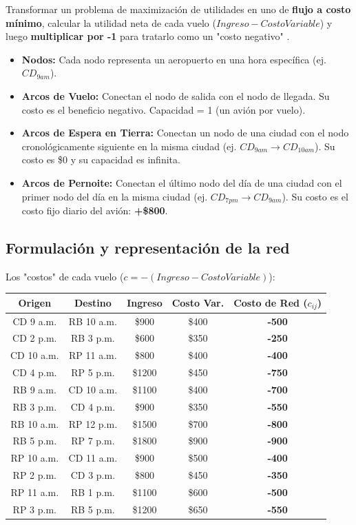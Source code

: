 \documentclass[10pt,a4paper]{article}
\begin{document}
Transformar un problema de maximización de utilidades en uno de \textbf{flujo a costo mínimo},
calcular la utilidad neta de cada vuelo 
($Ingreso - Costo Variable$) y luego 
\textbf{multiplicar por -1} 
para tratarlo como un "costo negativo" .

\begin{itemize}
    \item \textbf{Nodos:} Cada nodo representa un aeropuerto en una hora específica (ej. $CD_{9am}$).
    \item \textbf{Arcos de Vuelo:} Conectan el nodo de salida con el nodo de llegada. Su costo es el beneficio negativo. Capacidad = 1 (un avión por vuelo).
    \item \textbf{Arcos de Espera en Tierra:} Conectan un nodo de una ciudad con el nodo cronológicamente siguiente en la misma ciudad (ej. $CD_{9am} \to CD_{10am}$). Su costo es \$0 y su capacidad es infinita.
    \item \textbf{Arcos de Pernoite:} Conectan el último nodo del día de una ciudad con el primer nodo del día en la misma ciudad (ej. $CD_{7pm} \to CD_{9am}$). Su costo es el costo fijo diario del avión: \textbf{+\$800}.
\end{itemize}

\subsection{Formulación y representación de la red}

Los "costos" de cada vuelo ($c = -(Ingreso - Costo Variable)$):

\begin{table}[h!]
\centering
\begin{tabular}{ccccc}
\hline
\textbf{Origen} & \textbf{Destino} & \textbf{Ingreso} & \textbf{Costo Var.} & \textbf{Costo de Red ($c_{ij}$)} \\
\hline
CD 9 a.m. & RB 10 a.m. & \$900 & \$400 & \textbf{-500} \\
CD 2 p.m. & RB 3 p.m. & \$600 & \$350 & \textbf{-250} \\
CD 10 a.m. & RP 11 a.m. & \$800 & \$400 & \textbf{-400} \\
CD 4 p.m. & RP 5 p.m. & \$1200 & \$450 & \textbf{-750} \\
RB 9 a.m. & CD 10 a.m. & \$1100 & \$400 & \textbf{-700} \\
RB 3 p.m. & CD 4 p.m. & \$900 & \$350 & \textbf{-550} \\
RB 10 a.m. & RP 12 p.m. & \$1500 & \$700 & \textbf{-800} \\
RB 5 p.m. & RP 7 p.m. & \$1800 & \$900 & \textbf{-900} \\
RP 10 a.m. & CD 11 a.m. & \$900 & \$500 & \textbf{-400} \\
RP 2 p.m. & CD 3 p.m. & \$800 & \$450 & \textbf{-350} \\
RP 11 a.m. & RB 1 p.m. & \$1100 & \$600 & \textbf{-500} \\
RP 3 p.m. & RB 5 p.m. & \$1200 & \$650 & \textbf{-550} \\
\hline
\end{tabular}
\end{table}
\end{document}
